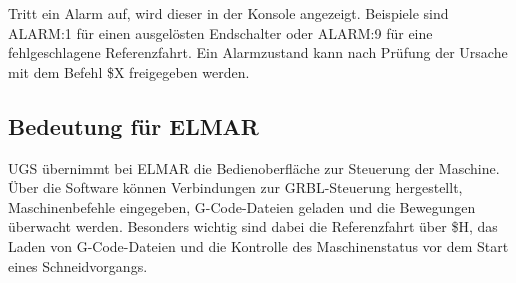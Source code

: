 Tritt ein Alarm auf, wird dieser in der Konsole angezeigt. Beispiele sind ALARM:1 für einen ausgelösten Endschalter oder ALARM:9 für eine fehlgeschlagene Referenzfahrt. Ein Alarmzustand kann nach Prüfung der Ursache mit dem Befehl \$X freigegeben werden.

\subsection{Bedeutung für ELMAR}

UGS übernimmt bei ELMAR die Bedienoberfläche zur Steuerung der Maschine. Über die Software können Verbindungen zur GRBL-Steuerung hergestellt, Maschinenbefehle eingegeben, G-Code-Dateien geladen und die Bewegungen überwacht werden. Besonders wichtig sind dabei die Referenzfahrt über \$H, das Laden von G-Code-Dateien und die Kontrolle des Maschinenstatus vor dem Start eines Schneidvorgangs.
